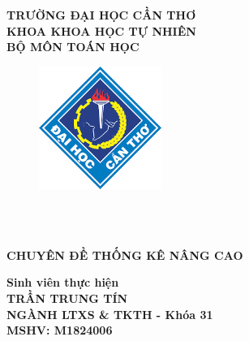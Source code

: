 \documentclass[a4paper,oneside]{../../styles/thesis}
\begin{document}
\fontsize{13pt}{22pt}\selectfont

\thispagestyle{empty}
\begin{titlepage}

\hspace{2.8cm} {\bf \fontsize{16pt}{16}\selectfont TRƯỜNG ĐẠI HỌC CẦN THƠ}\\
\vspace*{0.05cm}
\hspace{3.3cm} {\bf\fontsize{16pt}{16}\selectfont KHOA KHOA HỌC TỰ NHIÊN}\\
 \vspace*{0.05cm}
\hspace{4.3cm} {\bf\fontsize{16pt}{16}\selectfont BỘ MÔN TOÁN HỌC}\\

\begin{figure}[h!]
\hspace{5cm} \includegraphics[width=40mm]{../../assets/logos/university-logo.png}
\end{figure}

\vspace*{0.5cm}

\\
 \vspace*{0.05cm}\\
\vspace*{2cm}

\begin{center}
 {\bf\fontsize{20pt}{28}\selectfont CHUYÊN ĐỀ THỐNG KÊ NÂNG CAO}   
\end{center}




\vspace*{1.5cm}

\begin{center}
\textbf{Sinh viên thực hiện}\\    
\textbf{TRẦN TRUNG TÍN}\\
\textbf{NGÀNH LTXS \& TKTH - Khóa 31}\\
\textbf{MSHV: M1824006}\\
\vspace{1cm}
\end{center}



\vspace*{3cm}
\end{titlepage}
\end{document}
